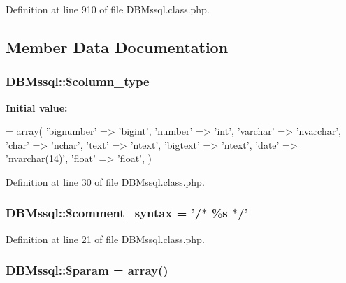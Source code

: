 Definition at line 910 of file D\-B\-Mssql.\-class.\-php.



\subsection{Member Data Documentation}
\hypertarget{classDBMssql_a785e589df00c87bb0003b573aa5d7fee}{
\subsubsection[{\$column\-\_\-type}]{\setlength{\rightskip}{0pt plus 5cm}D\-B\-Mssql\-::\$column\-\_\-type}}\label{classDBMssql_a785e589df00c87bb0003b573aa5d7fee}
{\bfseries Initial value\-:}
\begin{DoxyCode}
= array(
        \textcolor{stringliteral}{'bignumber'} => \textcolor{stringliteral}{'bigint'},
        \textcolor{stringliteral}{'number'} => \textcolor{stringliteral}{'int'},
        \textcolor{stringliteral}{'varchar'} => \textcolor{stringliteral}{'nvarchar'},
        \textcolor{stringliteral}{'char'} => \textcolor{stringliteral}{'nchar'},
        \textcolor{stringliteral}{'text'} => \textcolor{stringliteral}{'ntext'},
        \textcolor{stringliteral}{'bigtext'} => \textcolor{stringliteral}{'ntext'},
        \textcolor{stringliteral}{'date'} => \textcolor{stringliteral}{'nvarchar(14)'},
        \textcolor{stringliteral}{'float'} => \textcolor{stringliteral}{'float'},
    )
\end{DoxyCode}


Definition at line 30 of file D\-B\-Mssql.\-class.\-php.

\hypertarget{classDBMssql_ad095d953d508f44a326586a10c95336d}{
\subsubsection[{\$comment\-\_\-syntax}]{\setlength{\rightskip}{0pt plus 5cm}D\-B\-Mssql\-::\$comment\-\_\-syntax = '/$\ast$ \%s $\ast$/'}}\label{classDBMssql_ad095d953d508f44a326586a10c95336d}


Definition at line 21 of file D\-B\-Mssql.\-class.\-php.

\hypertarget{classDBMssql_a352ee40852cea6dc20de096486603805}{
\subsubsection[{\$param}]{\setlength{\rightskip}{0pt plus 5cm}D\-B\-Mssql\-::\$param = array()}}\label{classDBMssql_a352ee40852cea6dc20de096486603805}


